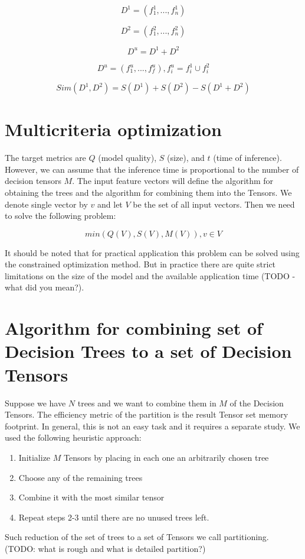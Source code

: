 \documentclass[a4paper]{jpconf}
\begin{document}
$$D^1 = (f^{1}_{1}, ..., f^{1}_{n})$$

$$D^2 = (f^{2}_{1}, ..., f^{2}_{n})$$

$$D^u = D^1 + D^2$$

$$D^u = (f^{u}_{1}, ..., f^{u}_{f}), f^{u}_{i} = f^{1}_{i} \cup f^{2}_{i}$$

$$Sim(D^1, D^2) = S(D^1) + S(D^2) - S(D^1 + D^2)$$

\section{Multicriteria optimization}

The target metrics are $ Q $ (model quality), $ S $ (size), and $ t $ (time of inference). However, we can assume that the inference time is proportional to the number of decision tensors $ M $.
The input feature vectors will define the algorithm for obtaining the trees and the algorithm for combining them into the Tensors. We denote single vector by $ v $ and let $V$ be the set of all input vectors. Then we need to solve the following problem:

$$min(Q(V), S(V), M(V)), v \in V$$

It should be noted that for practical application this problem can be solved using the constrained optimization method. But in practice there are quite strict limitations on the size of the model and the available application time (TODO - what did you mean?).

\section{Algorithm for combining set of Decision Trees to a set of Decision Tensors}

Suppose we have $N$ trees and we want to combine them in $M$ of the Decision Tensors. The efficiency metric of the partition is the result Tensor set memory footprint.
In general, this is not an easy task and it requires a separate study. We used the following heuristic approach:
\medskip
\renewcommand{\theenumi}{\arabic{enumi}}
\begin{enumerate}
\item Initialize $M$ Tensors by placing in each one an arbitrarily chosen tree
\item Choose any of the remaining trees
\item Combine it with the most similar tensor
\item Repeat steps 2-3 until there are no unused trees left.
\end{enumerate}
Such reduction of the set of trees to a set of Tensors we call partitioning. 
(TODO: what is rough and what is detailed partition?)
\end{document}
